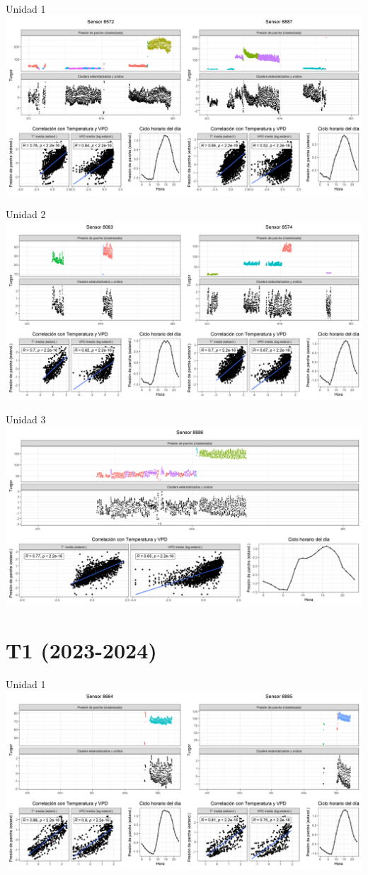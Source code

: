 \documentclass[
  letterpaper,
  DIV=11,
  numbers=noendperiod]{scrreprt}
\begin{document}
Unidad 1
\includegraphics{figuras/03_turgor_union/2022_2023_Rio_Claro_T4_Unidad_1.png}

Unidad 2
\includegraphics{figuras/03_turgor_union/2022_2023_Rio_Claro_T4_Unidad_2.png}

Unidad 3
\includegraphics{figuras/03_turgor_union/2022_2023_Rio_Claro_T4_Unidad_3.png}

\chapter{T1 (2023-2024)}

Unidad 1
\includegraphics{figuras/03_turgor_union/2023_2024_Rio_Claro_T1_Unidad_1.png}
\end{document}
